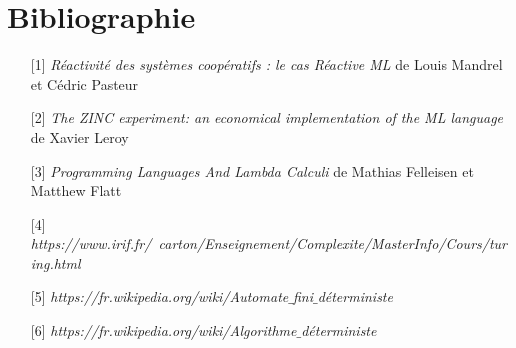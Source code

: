 \documentclass[10pt,a4paper]{article}
\begin{document}
		\section{Bibliographie}
			\begin{itemize}
				\item[] [1] \textit{Réactivité des systèmes coopératifs : le cas Réactive ML} de Louis Mandrel et Cédric Pasteur\label{ReactiveML}
				\item[] [2] \textit{The ZINC experiment: an economical implementation of the ML language} de Xavier Leroy\label{ZINC}
				\item[] [3] \textit{Programming Languages And Lambda Calculi} de Mathias Felleisen et Matthew Flatt\label{Calculi}
				\item[] [4] \textit{https://www.irif.fr/~carton/Enseignement/Complexite/MasterInfo/Cours/turing.html}\label{Turing}
				\item[] [5] \textit{https://fr.wikipedia.org/wiki/Automate$\_$fini$\_$déterministe}\label{AFD}
				\item[] [6] \textit{https://fr.wikipedia.org/wiki/Algorithme$\_$déterministe}\label{MFD}
			\end{itemize}
\end{document}
